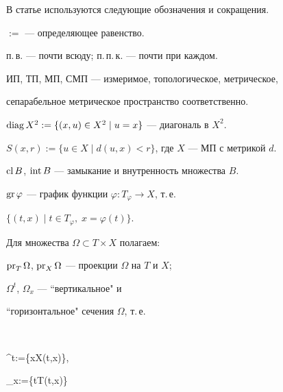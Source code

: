 В статье используются следующие обозначения и сокращения.










$:=$ --- определяющее равенство.





п.\,в. --- почти всюду; п.\,п.\,к. --- почти при каждом.





ИП, ТП, МП, СМП --- измеримое, топологическое, метрическое,


сепарабельное метрическое пространство соответственно.





$\operatorname{diag} X^2:=\{(x,u)\in X^2\mid u=x\}$ --- диагональ в $X^2$.





$S(x,r):=\{u\in X\mid d(u,x)<r\}$, где $X$ --- МП с метрикой $d$.





$\operatorname{cl} B$, $\operatorname{int} B$ --- замыкание и внутренность множества $B$.





$\operatorname{gr}\varphi$ --- график функции $\varphi:T_\varphi\to X$, т.\,е.


$\{(t,x)\mid t\in T_\varphi,\; x=\varphi(t)\}$.





{\noindent Для множества $\Omega\subset T\times X$ полагаем:}





$\operatorname{pr} _T\Omega$, $\operatorname{pr}_X\Omega$ --- проекции $\Omega$ на $T$ и $X$;





$\Omega ^t$, $\Omega _x$ --- ``вертикальное" и


``горизонтальное" сечения $\Omega$, т.\,е.


$$


\Omega ^t:=\{x\in X\mid (t,x)\in\Omega\},\quad


\Omega _x:=\{t\in T\mid (t,x)\in\Omega\}


